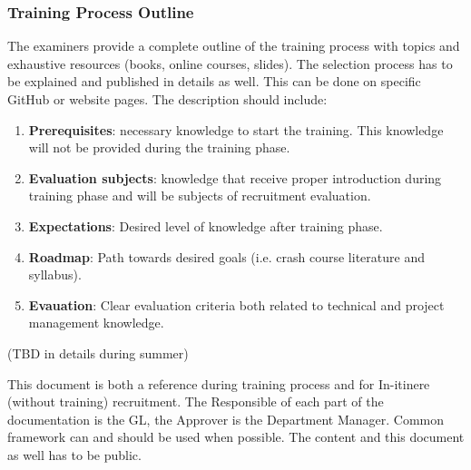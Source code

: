 \documentclass[graybox]{svmult}
\begin{document}
\subsubsection{Training Process Outline}
The examiners provide a complete outline of the training process with topics and exhaustive resources (books, online courses, slides). The selection process has to be explained and published in details as well. This can be done on specific GitHub or website pages.
The description should include:
\begin{enumerate}
\item \textbf{Prerequisites}: necessary knowledge to start the training. This knowledge will not be provided during the training phase.
\item \textbf{Evaluation subjects}: knowledge that receive proper introduction during training phase and will be subjects of recruitment evaluation.
\item \textbf{Expectations}: Desired level of knowledge after training phase.
\item \textbf{Roadmap}: Path towards desired goals (i.e. crash course literature and syllabus).
\item \textbf{Evauation}: Clear evaluation criteria both related to technical and project management knowledge.
\end{enumerate}
(TBD in details during summer)

\par
This document is both a reference during training process and for In-itinere (without training) recruitment. The Responsible of each part of the documentation is the GL, the Approver is the Department Manager. Common framework can and should be used when possible. The content and this document as well has to be public.

%
\end{document}
